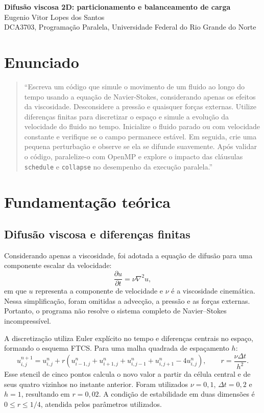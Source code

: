 \documentclass[11pt,letterpaper]{article}
\begin{document}
\pagestyle{plain}
\begin{center}
{\LARGE\bfseries Difusão viscosa 2D: particionamento e balanceamento de carga}\\[0.4em]
{\normalsize Eugenio Vitor Lopes dos Santos}\\[0.3em]
{\small DCA3703, Programação Paralela, Universidade Federal do Rio Grande do Norte}\\[0.3em]
\end{center}
\section{Enunciado}
\begin{quote}
``Escreva um código que simule o movimento de um fluido ao longo do tempo usando a equação de Navier-Stokes, considerando apenas os efeitos da viscosidade. Desconsidere a pressão e quaisquer forças externas. Utilize diferenças finitas para discretizar o espaço e simule a evolução da velocidade do fluido no tempo. Inicialize o fluido parado ou com velocidade constante e verifique se o campo permanece estável. Em seguida, crie uma pequena perturbação e observe se ela se difunde suavemente. Após validar o código, paralelize-o com OpenMP e explore o impacto das cláusulas \texttt{schedule} e \texttt{collapse} no desempenho da execução paralela.''
\end{quote}

\section{Fundamentação teórica}

\subsection{Difusão viscosa e diferenças finitas}
Considerando apenas a viscosidade, foi adotada a equação de difusão para uma componente escalar da velocidade:
\[
\frac{\partial u}{\partial t}=\nu\nabla^2u,
\]
em que $u$ representa a componente de velocidade e $\nu$ é a viscosidade cinemática. Nessa simplificação, foram omitidas a advecção, a pressão e as forças externas. Portanto, o programa não resolve o sistema completo de Navier--Stokes incompressível.

A discretização utiliza Euler explícito no tempo e diferenças centrais no espaço, formando o esquema FTCS. Para uma malha quadrada de espaçamento $h$:
\[
u^{n+1}_{i,j}=u^n_{i,j}+r\left(u^n_{i-1,j}+u^n_{i+1,j}+u^n_{i,j-1}+u^n_{i,j+1}-4u^n_{i,j}\right),
\qquad r=\frac{\nu\Delta t}{h^2}.
\]
Esse stencil de cinco pontos calcula o novo valor a partir da célula central e de seus quatro vizinhos no instante anterior. Foram utilizados $\nu=0{,}1$, $\Delta t=0{,}2$ e $h=1$, resultando em $r=0{,}02$. A condição de estabilidade em duas dimensões é $0\le r\le1/4$, atendida pelos parâmetros utilizados.
\end{document}
